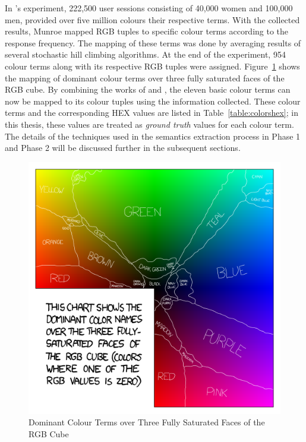 In 's experiment, 222,500 user sessions consisting of 40,000 women and 100,000 men, provided over five million colours their respective terms. With the collected results, Munroe mapped RGB tuples to specific colour terms according to the response frequency.
The mapping of these terms was done by averaging results of several stochastic hill climbing algorithms. At the end of the experiment, 954 colour terms along with its respective RGB tuples were assigned.
Figure~\ref{fig:xkcd} shows the mapping of dominant colour terms over three fully saturated faces of the RGB cube.
By combining the works of  and , the eleven basic colour terms can now be mapped to its colour tuples using the information collected. These colour terms and the corresponding HEX values are listed in Table~\ref{table:colorshex}; in this thesis, these values are treated as \textit{ground truth} values for each colour term.
The details of the techniques used in the semantics extraction process in Phase 1 and Phase 2 will be discussed further in the subsequent sections.

\begin{figure}[!hbt]\centering
\includegraphics[width=.6\textwidth]{image/general/xkcd.png}
\caption{Dominant Colour Terms over Three Fully Saturated Faces of the RGB Cube}
\label{fig:xkcd}
\end{figure}


